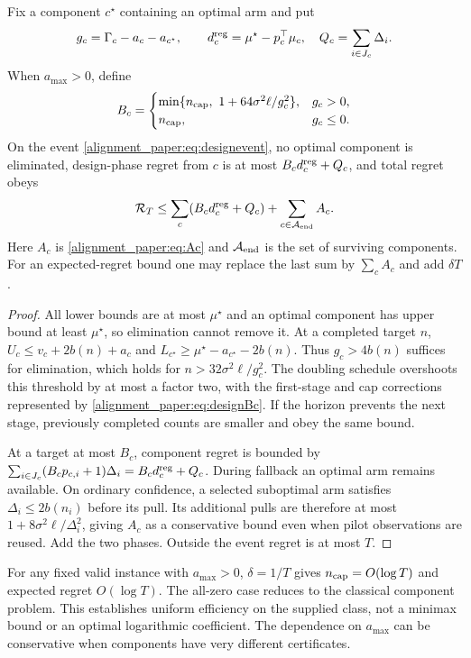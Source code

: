 \begin{theorem}
Fix a component $c^\star$ containing an optimal arm and put
\begin{equation}
 g_c=\Gamma_c-a_c-a_{c^\star},\qquad
 d_c^{\rm reg}=\mu^\star-p_c^\top\mu_c,
 \quad Q_c=\sum_{i\in J_c}\Delta_i.
\end{equation}
When $a_{\max}>0$, define
\begin{equation}
 B_c=\begin{cases}
 \min\{n_{\rm cap},\ 1+64\sigma^2\ell/g_c^2\},&g_c>0,\\
 n_{\rm cap},&g_c\le0.
 \end{cases}
 \label{alignment_paper:eq:designBc}
\end{equation}
On the event \eqref{alignment_paper:eq:designevent}, no optimal component is eliminated, design-phase regret from $c$ is at most $B_cd_c^{\rm reg}+Q_c$, and total regret obeys
\begin{equation}
 \mathcal R_T\le\sum_c(B_cd_c^{\rm reg}+Q_c)
       +\sum_{c\in\mathcal A_{\rm end}}A_c.
 \label{alignment_paper:eq:designregret}
\end{equation}
Here $A_c$ is \eqref{alignment_paper:eq:Ac} and $\mathcal A_{\rm end}$ is the set of surviving components. For an expected-regret bound one may replace the last sum by $\sum_cA_c$ and add $\delta T$.
\label{alignment_paper:thm:designregret}
\end{theorem}
\begin{proof}
All lower bounds are at most $\mu^\star$ and an optimal component has upper bound at least $\mu^\star$, so elimination cannot remove it. At a completed target $n$,
$U_c\le v_c+2b(n)+a_c$ and
$L_{c^\star}\ge\mu^\star-a_{c^\star}-2b(n)$.
Thus $g_c>4b(n)$ suffices for elimination, which holds for
$n>32\sigma^2\ell/g_c^2$. The doubling schedule overshoots this threshold by at most a factor two, with the first-stage and cap corrections represented by \eqref{alignment_paper:eq:designBc}. If the horizon prevents the next stage, previously completed counts are smaller and obey the same bound.

At a target at most $B_c$, component regret is bounded by
$\sum_{i\in J_c}(B_cp_{c,i}+1)\Delta_i=B_cd_c^{\rm reg}+Q_c$.
During fallback an optimal arm remains available. On ordinary confidence, a selected suboptimal arm satisfies $\Delta_i\le2b(n_i)$ before its pull. Its additional pulls are therefore at most $1+8\sigma^2\ell/\Delta_i^2$, giving $A_c$ as a conservative bound even when pilot observations are reused. Add the two phases. Outside the event regret is at most $T$.
\end{proof}
For any fixed valid instance with $a_{\max}>0$, $\delta=1/T$ gives $n_{\rm cap}=O(\log T)$ and expected regret $O(\log T)$. The all-zero case reduces to the classical component problem. This establishes uniform efficiency on the supplied class, not a minimax bound or an optimal logarithmic coefficient. The dependence on $a_{\max}$ can be conservative when components have very different certificates.

